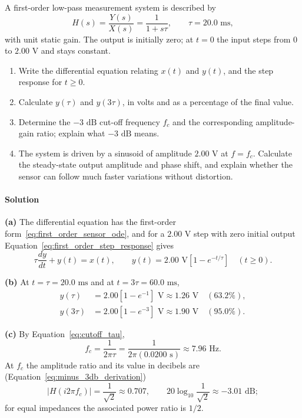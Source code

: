 A first-order low-pass measurement system is described by
\begin{equation*}
H(s) = \frac{Y(s)}{X(s)} = \frac{1}{1 + s\tau}, \qquad \tau = 20.0\text{ ms},
\end{equation*}
with unit static gain. The output is initially zero; at $t = 0$ the input steps from $0$ to $2.00\text{ V}$ and stays constant.
\begin{enumerate}[label=(\alph*)]
    \item Write the differential equation relating $x(t)$ and $y(t)$, and the step response for $t \ge 0$.
    \item Calculate $y(\tau)$ and $y(3\tau)$, in volts and as a percentage of the final value.
    \item Determine the $-3\text{ dB}$ cut-off frequency $f_c$ and the corresponding amplitude-gain ratio; explain what $-3\text{ dB}$ means.
    \item The system is driven by a sinusoid of amplitude $2.00\text{ V}$ at $f = f_c$. Calculate the steady-state output amplitude and phase shift, and explain whether the sensor can follow much faster variations without distortion.
\end{enumerate}

\paragraph{Solution} \textbf{(a)} The differential equation has the first-order form~\eqref{eq:first_order_sensor_ode}, and for a $2.00\text{ V}$ step with zero initial output Equation~\eqref{eq:first_order_step_response} gives
\begin{equation*}
\tau\frac{dy}{dt} + y(t) = x(t), \qquad y(t) = 2.00\text{ V}\left[1 - e^{-t/\tau}\right] \quad (t \ge 0).
\end{equation*}

\textbf{(b)} At $t = \tau = 20.0\text{ ms}$ and at $t = 3\tau = 60.0\text{ ms}$,
\begin{align*}
y(\tau) &= 2.00\left[1 - e^{-1}\right]\text{ V} \approx 1.26\text{ V} \quad (63.2\%), \\
y(3\tau) &= 2.00\left[1 - e^{-3}\right]\text{ V} \approx 1.90\text{ V} \quad (95.0\%).
\end{align*}

\textbf{(c)} By Equation~\eqref{eq:cutoff_tau},
\begin{equation*}
f_c = \frac{1}{2\pi\tau} = \frac{1}{2\pi(0.0200\text{ s})} \approx 7.96\text{ Hz}.
\end{equation*}
At $f_c$ the amplitude ratio and its value in decibels are (Equation~\eqref{eq:minus_3db_derivation})
\begin{equation*}
|H(i2\pi f_c)| = \frac{1}{\sqrt{2}} \approx 0.707, \qquad 20\log_{10}\frac{1}{\sqrt{2}} \approx -3.01\text{ dB};
\end{equation*}
for equal impedances the associated power ratio is $1/2$.

